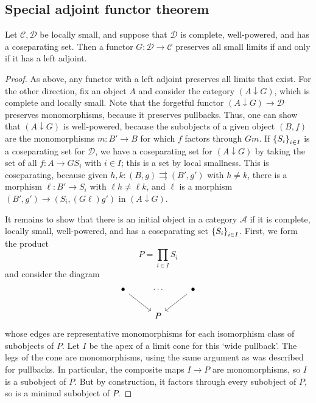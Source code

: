 \subsection{Special adjoint functor theorem}
\begin{theorem}
    Let \( \mathcal C, \mathcal D \) be locally small, and suppose that \( \mathcal D \) is complete, well-powered, and has a coseparating set.
    Then a functor \( G : \mathcal D \to \mathcal C \) preserves all small limits if and only if it has a left adjoint.
\end{theorem}
\begin{proof}
    As above, any functor with a left adjoint preserves all limits that exist.
    For the other direction, fix an object \( A \) and consider the category \( (A \downarrow G) \), which is complete and locally small.
    Note that the forgetful functor \( (A \downarrow G) \to \mathcal D \) preserves monomorphisms, because it preserves pullbacks.
    Thus, one can show that \( (A \downarrow G) \) is well-powered, because the subobjects of a given object \( (B, f) \) are the monomorphisms \( m : B' \to B \) for which \( f \) factors through \( Gm \).
    If \( \qty{S_i}_{i \in I} \) is a coseparating set for \( \mathcal D \), we have a coseparating set for \( (A \downarrow G) \) by taking the set of all \( f : A \to GS_i \) with \( i \in I \); this is a set by local smallness.
    This is coseparating, because given \( h, k : (B, g) \rightrightarrows (B', g') \) with \( h \neq k \), there is a morphism \( \ell : B' \to S_i \) with \( \ell h \neq \ell k \), and \( \ell \) is a morphism \( (B', g') \to (S_i, (G\ell)g') \) in \( (A \downarrow G) \).

    It remains to show that there is an initial object in a category \( \mathcal A \) if it is complete, locally small, well-powered, and has a coseparating set \( \qty{S_i}_{i \in I} \).
    First, we form the product
    \[ P = \prod_{i \in I} S_i \]
    and consider the diagram
\[\begin{tikzcd}
	\bullet & \cdots & \bullet \\
	& P
	\arrow[from=1-1, to=2-2]
	\arrow[from=1-3, to=2-2]
\end{tikzcd}\]
    whose edges are representative monomorphisms for each isomorphism class of subobjects of \( P \).
    Let \( I \) be the apex of a limit cone for this `wide pullback'.
    The legs of the cone are monomorphisms, using the same argument as was described for pullbacks.
    In particular, the composite maps \( I \to P \) are monomorphisms, so \( I \) is a subobject of \( P \).
    But by construction, it factors through every subobject of \( P \), so is a minimal subobject of \( P \).


\end{proof}
